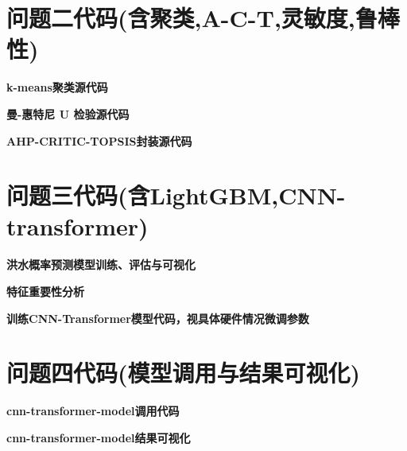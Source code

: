 \documentclass[withoutpreface,bwprint]{cumcmthesis} %
\begin{document}
\section{问题二代码(含聚类,A-C-T,灵敏度,鲁棒性)}
\textbf{\textcolor[rgb]{0.98,0.00,0.00}{k-means聚类源代码}}

\textbf{\textcolor[rgb]{0.98,0.00,0.00}{曼-惠特尼 U 检验源代码}}

\textbf{\textcolor[rgb]{0.98,0.00,0.00}{AHP-CRITIC-TOPSIS封装源代码}}

\section{问题三代码(含LightGBM,CNN-transformer)}
\textbf{\textcolor[rgb]{0.98,0.00,0.00}{洪水概率预测模型训练、评估与可视化}}

\textbf{\textcolor[rgb]{0.98,0.00,0.00}{特征重要性分析}}

\textbf{\textcolor[rgb]{0.98,0.00,0.00}{训练CNN-Transformer模型代码，视具体硬件情况微调参数}}

\section{问题四代码(模型调用与结果可视化)}
\textbf{\textcolor[rgb]{0.98,0.00,0.00}{cnn-transformer-model调用代码}}

\textbf{\textcolor[rgb]{0.98,0.00,0.00}{cnn-transformer-model结果可视化}}

\end{document}
